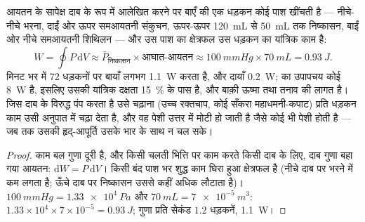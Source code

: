 \begin{theorem}[हृदय का काम]\label{thm:b2:heart:work}
आयतन के सापेक्ष दाब के रूप में आलेखित करने पर बाएँ  की एक धड़कन
कोई पाश खींचती है --- नीचे-नीचे भरना, दाईं ओर ऊपर समआयतनी
संकुचन, ऊपर-ऊपर \qty{120}{mL} से \qty{50}{mL} तक निष्कासन,
बाईं ओर नीचे समआयतनी शिथिलन --- और उस पाश का
क्षेत्रफल उस धड़कन का यांत्रिक काम है:
\[
W = \oint P\,\mathrm{d}V \approx \bar P_{\text{निष्कासन}}\times \text{आघात-आयतन} \approx \qty{100}{mmHg}\times\qty{70}{mL} = \qty{0.93}{J}.
\]
मिनट भर में 72 धड़कनों पर बायाँ  लगभग \qty{1.1}{W} करता है, और
दायाँ \qty{0.2}{W};  का उपापचय कोई \qty{8}{W} है, इसलिए उसकी
यांत्रिक दक्षता \qty{15}{\%} के पास है, और बाक़ी ऊष्मा तथा
तनाव की लागत है।  जिस दाब के विरुद्ध पंप करता है उसे चढ़ाना
(उच्च रक्तचाप, कोई सँकरा महाधमनी-कपाट) प्रति धड़कन काम उसी
अनुपात में चढ़ा देता है, और वह पेशी उत्तर में मोटी हो जाती है जैसे कोई भी पेशी होती है
--- जब तक उसकी हृद्-आपूर्ति उसके भार के साथ न चल सके।
\end{theorem}
\begin{proof}
काम बल गुणा दूरी है, और किसी चलती भित्ति पर काम करते किसी दाब के लिए,
दाब गुणा बहा गया आयतन: $\mathrm{d}W = P\,\mathrm{d}V$।
किसी बंद पाश भर शुद्ध काम घिरा हुआ क्षेत्रफल है (नीचे दाब पर
भरने में कम लगता है; ऊँचे दाब पर निष्कासन उससे कहीं अधिक
लौटाता है)। $\qty{100}{mmHg} = \qty{1.33e4}{Pa}$ और $\qty{70}{mL} =
\qty{7e-5}{m^3}$: $1.33\times 10^{4}\times 7\times 10^{-5} =
\qty{0.93}{J}$; गुणा प्रति सेकंड $1.2$ धड़कनें, \qty{1.1}{W}।
\end{proof}

